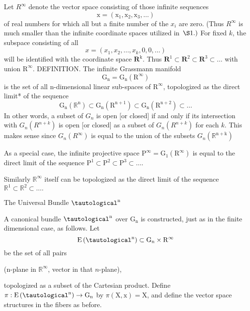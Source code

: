 \documentclass[10pt]{article}
\begin{document}
Let $R^{\infty}$ denote the vector space consisting of those infinite sequences
$$
\mathrm{x}=\left(\mathrm{x}_{1}, \mathrm{x}_{2}, \mathrm{x}_{3}, \ldots\right)
$$
of real numbers for which all but a finite number of the $x_{i}$ are zero. (Thus $R^{\infty}$ is much smaller than the infinite coordinate spaces utilized in $\left.\S 1 .\right)$ For fixed $k$, the subspace consisting of all
$$
x=\left(x_{1}, x_{2}, \ldots, x_{k}, 0,0, \ldots\right)
$$
will be identified with the coordinate space $\mathbf{R}^{\mathrm{k}}$. Thus $\mathbf{R}^{1} \subset \mathbf{R}^{2} \subset \mathbf{R}^{3} \subset \ldots$ with union $\mathrm{R}^{\infty}$. DEFINITION. The infinite Grassmann manifold
$$
\mathrm{G}_{\mathrm{n}}=\mathrm{G}_{\mathrm{n}}\left(\mathrm{R}^{\infty}\right)
$$
is the set of all $\mathrm{n}$-dimensional linear sub-spaces of $\mathrm{R}^{\infty}$, topologized as the direct limit* of the sequence
$$
\mathrm{G}_{\mathrm{n}}\left(\mathbb{R}^{\mathrm{n}}\right) \subset \mathrm{G}_{\mathrm{n}}\left(\mathrm{R}^{\mathrm{n}+1}\right) \subset \mathrm{G}_{\mathrm{n}}\left(\mathrm{R}^{\mathrm{n}+2}\right) \subset \ldots
$$
In other words, a subset of $G_{n}$ is open [or closed] if and only if its intersection with $G_{n}\left(R^{n+k}\right)$ is open [or closed] as a subset of $G_{n}\left(R^{n+k}\right)$ for each $k$. This makes sense since $G_{n}\left(R^{\infty}\right)$ is equal to the union of the subsets $G_{n}\left(\mathbb{R}^{\mathrm{n}+\mathrm{k}}\right)$

As a special case, the infinite projective space $\mathrm{P}^{\infty}=\mathrm{G}_{1}\left(\mathrm{R}^{\infty}\right)$ is equal to the direct limit of the sequence $\mathrm{P}^{1} \subset \mathrm{P}^{2} \subset \mathrm{P}^{3} \subset \ldots .$

Similarly $\mathbb{R}^{\infty}$ itself can be topologized as the direct limit of the sequence $\mathbb{R}^{1} \subset \mathbb{R}^{2} \subset \ldots .$

The Universal Bundle $\tautological^{\mathrm{n}}$

A canonical bundle $\tautological^{\mathrm{n}}$ over $\mathrm{G}_{\mathrm{n}}$ is constructed, just as in the finite dimensional case, as follows. Let
$$
\mathrm{E}\left(\tautological^{\mathrm{n}}\right) \subset \mathrm{G}_{\mathrm{n}} \times \mathrm{R}^{\infty}
$$
be the set of all pairs

(n-plane in $\mathbb{R}^{\infty}$, vector in that $n$-plane),

topologized as a subset of the Cartesian product. Define $\pi: \mathrm{E}\left(\tautological^{\mathrm{n}}\right) \rightarrow \mathrm{G}_{\mathrm{n}}$ by $\pi(\mathrm{X}, \mathrm{x})=\mathrm{X}$, and define the vector space structures in the fibers as before.
\end{document}
